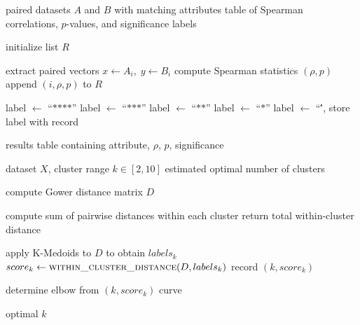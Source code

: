 \documentclass[a4paper, 12pt, twoside]{report}  %
\begin{document}
\begin{algorithm}[H]
\caption{Spearman Correlation Analysis}\label{alg:spearman_correlation}
\begin{algorithmic}[1]
\Require paired datasets $A$ and $B$ with matching attributes
\Ensure table of Spearman correlations, $p$-values, and significance labels

\State initialize list $R$

    \State extract paired vectors $x \gets A_i,\; y \gets B_i$
    \State compute Spearman statistics $(\rho, p)$
    \State append $(i, \rho, p)$ to $R$
\EndFor

     \State label $\gets$ ``$\text{****}$''
     \State label $\gets$ ``$\text{***}$''
     \State label $\gets$ ``$\text{**}$''
     \State label $\gets$ ``$\text{*}$''
    \Else \State label $\gets$ ``\'',
    \EndIf
    \State store label with record
\EndFor

\Ensure results table containing attribute, $\rho$, $p$, significance
\end{algorithmic}
\end{algorithm}

\newpage
{}

\begin{algorithm}[ht]
\caption{Elbow Method with Gower + KMedoids}\label{alg:elbow}
\begin{algorithmic}[1]
\Require dataset $X$, cluster range $k \in [2,10]$
\Ensure estimated optimal number of clusters

\State compute Gower distance matrix $D$

    \State compute sum of pairwise distances within each cluster
    \State return total within-cluster distance
\EndFunction

    \State apply K-Medoids to $D$ to obtain $labels_k$
    \State $score_k \gets \Call{within\_cluster\_distance}{D, labels_k}$
    \State record $(k, score_k)$
\EndFor

\State determine elbow from $(k, score_k)$ curve

\Ensure optimal $k$
\end{algorithmic}
\end{algorithm}


\end{document}
